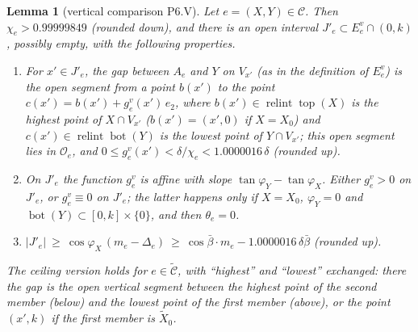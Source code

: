 \documentclass[11pt]{amsart}
\newcommand{\relint}{\operatorname{relint}}
\newcommand{\Bot}{\operatorname{bot}}
\newcommand{\Top}{\operatorname{top}}
\newcommand{\bbar}{\bar\beta}
\newtheorem{lemma}[theorem]{Lemma}
\theoremstyle{definition}
\theoremstyle{remark}
\numberwithin{equation}{section}
\begin{document}
\begin{lemma}[vertical comparison P6.V]\label{lem:P6V}
Let $e=(X,Y)\in\mathcal C$. Then $\chi_e>0.99999849$ \textup{(}rounded down\textup{)}, and there is an open interval
$J'_e\subset E^v_e\cap(0,k)$, possibly empty, with the following properties.
\begin{enumerate}[label=(\alph*)]
\item For $x'\in J'_e$, the gap between $A_e$ and $Y$ on $V_{x'}$ \textup{(}as in the definition of $E^v_e$\textup{)}
is the open segment from a point $b(x')$ to the point $c(x')=b(x')+g^v_e(x')\,e_2$, where $b(x')\in\relint\Top(X)$
is the highest point of $X\cap V_{x'}$ \textup{(}$b(x')=(x',0)$ if $X=X_0$\textup{)} and $c(x')\in\relint\Bot(Y)$ is
the lowest point of $Y\cap V_{x'}$; this open segment lies in $\mathcal O_e$, and
$0\le g^v_e(x')<\delta/\chi_e<1.0000016\,\delta$ \textup{(}rounded up\textup{)}.
\item On $J'_e$ the function $g^v_e$ is affine with slope $\tan\varphi_Y-\tan\varphi_X$. Either $g^v_e>0$ on $J'_e$,
or $g^v_e\equiv0$ on $J'_e$; the latter happens only if $X=X_0$, $\varphi_Y=0$ and $\Bot(Y)\subset[0,k]\times\{0\}$,
and then $\theta_e=0$.
\item $|J'_e|\ \ge\ \cos\varphi_X\,(m_e-\Delta_e)\ \ge\ \cos\bbar\cdot m_e-1.0000016\,\delta\bbar$
\textup{(}rounded up\textup{)}.
\end{enumerate}
The ceiling version holds for $e\in\tilde{\mathcal C}$, with ``highest'' and ``lowest'' exchanged: there the gap is the
open vertical segment between the highest point of the second member \textup{(}below\textup{)} and the lowest point of
the first member \textup{(}above\textup{)}, or the point $(x',k)$ if the first member is $\tilde X_0$.
\end{lemma}
\end{document}
